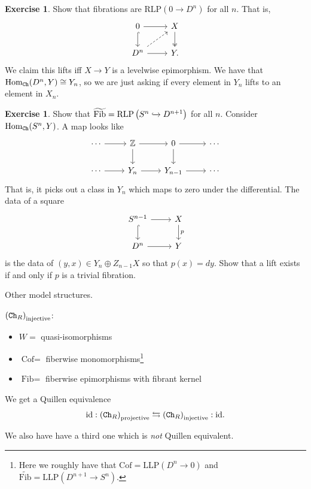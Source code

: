 \documentclass[12pt]{amsart}
\let\til\widetilde
\theoremstyle{definition}
\newtheorem{exercise}[theorem]{Exercise}
\providecommand{\Cof}{\text{Cof}}
\providecommand{\Fib}{\text{Fib}}
\providecommand{\LLP}{\text{LLP}}
\providecommand{\RLP}{\text{RLP}}
\begin{document}
\begin{exercise} Show that fibrations are $\RLP(0\to D^n)$ for all $n$. That is,
\[ \begin{tikzcd}
    0\dar[hook]\rar & X\dar[two heads]\\
    D^n\rar\ar[ur,dashed] & Y.
\end{tikzcd} \]
We claim this lifts iff $X \to Y$ is a levelwise epimorphism. We have that $\text{Hom}_{\texttt{Ch}}(D^n,Y) \cong Y_n$, so we are just asking if every element in $Y_n$ lifts to an element in $X_n$.
\end{exercise}

\begin{exercise} Show that $\til{\Fib} = \RLP \left( S^n \hookto D^{n+1} \right)$ for all $n$. Consider $\text{Hom}_{\texttt{Ch}}(S^n,Y)$. A map looks like
\[ \begin{tikzcd}
    \cdots\rar & \Z\rar\dar & 0\rar\dar & \cdots \\
    \cdots\rar & Y_n\rar & Y_{n-1}\rar & \cdots
\end{tikzcd} \]
That is, it picks out a class in $Y_n$ which maps to zero under the differential. The data of a square
\[ \begin{tikzcd}
    S^{n-1}\dar[hook]\rar & X\dar["p" right]\\
    D^n\rar & Y
\end{tikzcd} \]
is the data of $(y,x) \in Y_n \oplus Z_{n-1} X$ so that $p(x) = dy$. Show that a lift exists if and only if $p$ is a trivial fibration.
\end{exercise}

Other model structures.

$\left( \texttt{Ch}_R \right)_\text{injective}$:
\begin{itemize}
    \item $W=$ quasi-isomorphisms
    \item $\Cof=$ fiberwise monomorphisms\footnote{Here we roughly have that $\Cof = \LLP(D^n \to 0)$ and $\til{\Fib} = \LLP(D^{n+1}\to S^n)$.}
    \item $\Fib=$ fiberwise epimorphisms with fibrant kernel
\end{itemize}

We get a Quillen equivalence
\begin{align*}
    \text{id}: \left( \texttt{Ch}_R \right)_\text{projective} \leftrightarrows \left( \texttt{Ch}_R \right)_\text{injective}: \text{id}.
\end{align*}

We also have have a third one which is \textit{not} Quillen equivalent.
\end{document}
